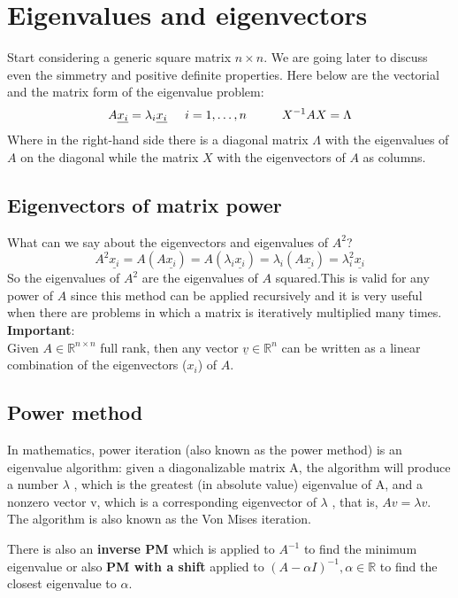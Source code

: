 \section{Eigenvalues and eigenvectors}
Start considering a generic square matrix $n \times n$. We are going later to discuss even the simmetry and positive definite properties.
Here below are the vectorial and the matrix form of the eigenvalue problem:
\[
    A\underline{x_i} = \lambda_i\underline{x_i} \hspace{0.5cm} i = 1, \dots, n \hspace{1cm} X^{-1}AX = \Lambda
\]
Where in the right-hand side there is a diagonal matrix $\Lambda$ with the eigenvalues of $A$ on the diagonal while the matrix $X$ with the eigenvectors of $A$ as columns.\\

\subsection{Eigenvectors of matrix power}
What can we say about the eigenvectors and eigenvalues of $A^2$?
\[
    A^2\underline{x_i} = A(A\underline{x_i}) = A(\lambda_i\underline{x_i}) = \lambda_i(A\underline{x_i}) = \lambda_i^2\underline{x_i}    
\]
So the eigenvalues of $A^2$ are the eigenvalues of $A$ squared.This is valid for any power of $A$ since this method can be applied recursively and it is very useful when there are problems in which a matrix is iteratively multiplied many times. \\

\textbf{Important}:\\
Given $A\in \mathbb{R}^{n\times n}$ full rank, then any vector $\underline{v} \in \mathbb{R}^n$ can be written as a linear combination of the eigenvectors ($x_i$) of $A$.\\

\subsection{Power method}
In mathematics, power iteration (also known as the power method) is an eigenvalue algorithm: given a diagonalizable matrix A, the algorithm will produce a number $\lambda$ , which is the greatest (in absolute value) eigenvalue of A, and a nonzero vector v, which is a corresponding eigenvector of $\lambda$ , that is, $Av=\lambda v$. The algorithm is also known as the Von Mises iteration.

There is also an \textbf{inverse PM} which is applied to $A^{-1}$ to find the minimum eigenvalue or also \textbf{PM with a shift} applied to $(A-\alpha I)^{-1}, \alpha \in \mathbb{R}$ to find the closest eigenvalue to $\alpha$. 


